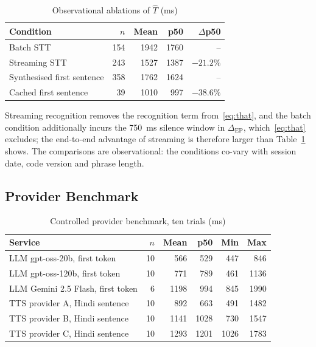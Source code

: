 \documentclass[conference]{IEEEtran}
\begin{document}
\begin{table}[htbp]
\caption{Observational ablations of $\hat{T}$ (ms)}
\label{tab:ablation}
\centering
\footnotesize
\begin{tabular}{@{}lrrrr@{}}
\toprule
Condition & $n$ & Mean & p50 & $\Delta$p50 \\
\midrule
Batch STT & 154 & 1942 & 1760 & -- \\
Streaming STT & 243 & 1527 & 1387 & $-21.2\%$ \\
\midrule
Synthesised first sentence & 358 & 1762 & 1624 & -- \\
Cached first sentence & 39 & 1010 & 997 & $-38.6\%$ \\
\bottomrule
\end{tabular}
\end{table}

Streaming recognition removes the recognition term from~\eqref{eq:that}, and the batch condition additionally incurs the 750~ms silence window in $\Delta_{\mathrm{EP}}$, which~\eqref{eq:that} excludes; the end-to-end advantage of streaming is therefore larger than Table~\ref{tab:ablation} shows. The comparisons are observational: the conditions co-vary with session date, code version and phrase length.

\subsection{Provider Benchmark}

\begin{table}[htbp]
\caption{Controlled provider benchmark, ten trials (ms)}
\label{tab:bench}
\centering
\footnotesize
\begin{tabular}{@{}lrrrrr@{}}
\toprule
Service & $n$ & Mean & p50 & Min & Max \\
\midrule
LLM gpt-oss-20b, first token & 10 & 566 & 529 & 447 & 846 \\
LLM gpt-oss-120b, first token & 10 & 771 & 789 & 461 & 1136 \\
LLM Gemini 2.5 Flash, first token & 6 & 1198 & 994 & 845 & 1990 \\
TTS provider A, Hindi sentence & 10 & 892 & 663 & 491 & 1482 \\
TTS provider B, Hindi sentence & 10 & 1141 & 1028 & 730 & 1547 \\
TTS provider C, Hindi sentence & 10 & 1293 & 1201 & 1026 & 1783 \\
\bottomrule
\end{tabular}
\end{table}
\end{document}
